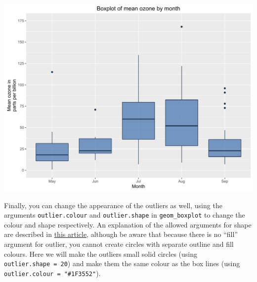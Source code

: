 \begin{Shaded}
\begin{Highlighting}[]
\StringTok{ }\NormalTok{(}  \StringTok{ }
\StringTok{       }\NormalTok{(}  
\StringTok{         } \NormalTok{) +}
\StringTok{       }\NormalTok{(} \NormalTok{,}
\StringTok{         } \NormalTok{(}\NormalTok{, }\NormalTok{, }\NormalTok{),} \NormalTok{(}\NormalTok{, }\NormalTok{)) +}
\StringTok{       }\NormalTok{(} \NormalTok{) +}
\StringTok{       }\NormalTok{(}\NormalTok{)}
\end{Highlighting}
\end{Shaded}

\begin{center}\includegraphics[width=0.55\linewidth]{figures/box_8-1} \end{center}

Finally, you can change the appearance of the outliers as well, using
the arguments \texttt{outlier.colour} and \texttt{outlier.shape} in
\texttt{geom\_boxplot} to change the colour and shape respectively. An
explanation of the allowed arguments for shape are described in
\href{http://sape.inf.usi.ch/quick-reference/ggplot2/shape}{this
article}, although be aware that because there is no ``fill'' argument
for outlier, you cannot create circles with separate outline and fill
colours. Here we will make the outliers small solid circles (using
\texttt{outlier.shape\ =\ 20}) and make them the same colour as the box
lines (using \texttt{outlier.colour\ =\ "\#1F3552"}).

